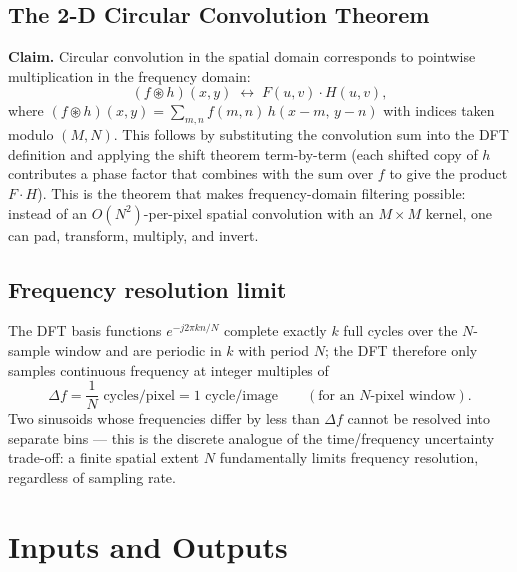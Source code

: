 \documentclass[11pt]{article}
\begin{document}
\subsection{The 2-D Circular Convolution Theorem}

\textbf{Claim.} Circular convolution in the spatial domain corresponds to pointwise
multiplication in the frequency domain:
\begin{equation}
  (f \circledast h)(x,y) \;\longleftrightarrow\; F(u,v)\cdot H(u,v),
\end{equation}
where $(f\circledast h)(x,y) = \sum_{m,n} f(m,n)\, h(x-m,\,y-n)$ with indices taken modulo
$(M,N)$. This follows by substituting the convolution sum into the DFT definition and applying
the shift theorem term-by-term (each shifted copy of $h$ contributes a phase factor that combines
with the sum over $f$ to give the product $F\cdot H$). This is the theorem that makes
frequency-domain filtering possible: instead of an $O(N^2)$-per-pixel spatial convolution with an
$M\times M$ kernel, one can pad, transform, multiply, and invert.

\subsection{Frequency resolution limit}

The DFT basis functions $e^{-j2\pi kn/N}$ complete exactly $k$ full cycles over the $N$-sample
window and are periodic in $k$ with period $N$; the DFT therefore only samples continuous
frequency at integer multiples of
\begin{equation}
  \Delta f = \frac{1}{N} \text{ cycles/pixel} = 1\text{ cycle/image} \qquad (\text{for an }N
  \text{-pixel window}).
\end{equation}
Two sinusoids whose frequencies differ by less than $\Delta f$ cannot be resolved into separate
bins — this is the discrete analogue of the time/frequency uncertainty trade-off: a finite
spatial extent $N$ fundamentally limits frequency resolution, regardless of sampling rate.

\section{Inputs and Outputs}
\end{document}
